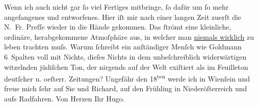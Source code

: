 \begin{ledgroupsized}[t]{13cm}
           \pstart
           Wenn ich auch nicht gar ſo viel Fertiges mitbringe, ſo dafür um ſo mehr angefangenes
               und entworfenes.\pend
           \pstart
           Hier iſt mir nach einer langen Zeit zuerſt die N. Fr.
                  Preſſe wieder in die Hände gekommen. Das ſtrömt eine kleinliche, ordinäre,
               herabgekommene Atmoſphäre {\pb}aus, in
               welcher man \uline{niemals wirklich} zu leben trachten
               muſs.\pend
           \pstart
           Warum ſchreibt ein anſtändiger
               Menſch wie Goldmann 6 Spalten voll mit
               Nichts, dieſes Nichts in dem unbeſchreiblich widerwärtigen witzelnden jüdiſchen Ton,
               der nirgends auf der Welt exiſtiert als im Feuilleton deutſcher u. oeſterr. Zeitungen? \pend
           \pstart
           {\pb}Ungefähr den 18\textsuperscript{ten} werde ich in Wienſein und freue mich ſehr auf Sie und Richard, auf den Frühling in Niederöſterreich und aufs Radfahren.\pend
           \pstart Von Herzen Ihr \spacefill\mbox{Hugo.}\pend{}
         
         \endnumbering{}\end{ledgroupsized}  \newcommand{\dateiname}{L01035}\newcommand{\titel}{Hugo von Hofmannsthal an Arthur Schnitzler, 6. 5. [1900]}\newcommand{\editorInnen}{Martin Anton Müller und Gerd-Hermann Susen}
      